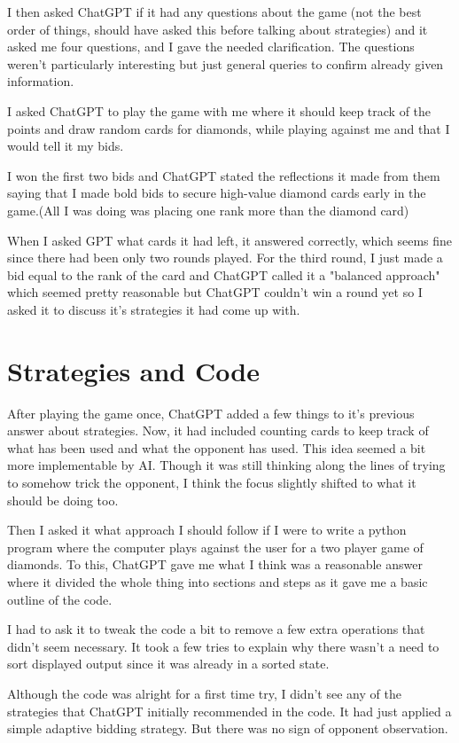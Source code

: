 \documentclass{article}
\begin{document}
I then asked ChatGPT if it had any questions about the game (not the best order of things, should have asked this before talking about strategies) and it asked me four questions, and I gave the needed clarification. The questions weren't particularly interesting but just general queries to confirm already given information.

I asked ChatGPT to play the game with me where it should keep track of the points and draw random cards for diamonds, while playing against me and that I would tell it my bids.

I won the first two bids and ChatGPT stated the reflections it made from them saying that I made bold bids to secure high-value diamond cards early in the game.(All I was doing was placing one rank more than the diamond card)

When I asked GPT what cards it had left, it answered correctly, which seems fine since there had been only two rounds played. For the third round, I just made a bid equal to the rank of the card and ChatGPT called it a "balanced approach" which seemed pretty reasonable but ChatGPT couldn't win a round yet so I asked it to discuss it's strategies it had come up with.

\section{Strategies and Code}
After playing the game once, ChatGPT added a few things to it's previous answer about strategies. Now, it had included counting cards to keep track of what has been used and what the opponent has used. This idea seemed a bit more implementable by AI. Though it was still thinking along the lines of trying to somehow trick the opponent, I think the focus slightly shifted to what it should be doing too.

Then I asked it what approach I should follow if I were to write a python program where the computer plays against the user for a two player game of diamonds. To this, ChatGPT gave me what I think was a reasonable answer where it divided the whole thing into sections and steps as it gave me a basic outline of the code.

I had to ask it to tweak the code a bit to remove a few extra operations that didn't seem necessary. It took a few tries to explain why there wasn't a need to sort displayed output since it was already in a sorted state.

Although the code was alright for a first time try, I didn't see any of the strategies that ChatGPT initially recommended in the code. It had just applied a simple adaptive bidding strategy. But there was no sign of opponent observation. 
\end{document}
